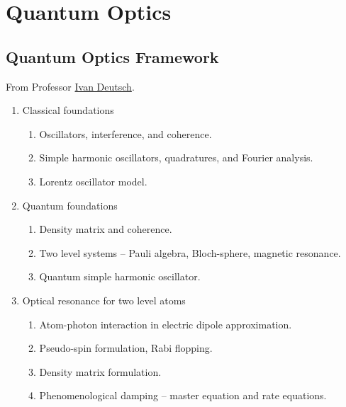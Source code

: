 \documentclass[letterpaper,10pt,english]{sphinxmanual}
\begin{document}
\section{Quantum Optics}
\label{Quantum/QuantumOptics:quantum-optics}\label{Quantum/QuantumOptics::doc}

\subsection{Quantum Optics Framework}
\label{Quantum/QuantumOptics:quantum-optics-framework}
From Professor \href{http://info.phys.unm.edu/~ideutsch/Classes/Phys566F13/index.htm\#syllabus}{Ivan Deutsch}.
\begin{enumerate}
\item {} 
Classical foundations
\begin{enumerate}
\item {} 
Oscillators, interference, and coherence.

\item {} 
Simple harmonic oscillators, quadratures, and Fourier analysis.

\item {} 
Lorentz oscillator model.

\end{enumerate}

\item {} 
Quantum foundations
\begin{enumerate}
\item {} 
Density matrix and coherence.

\item {} 
Two level systems -- Pauli algebra, Bloch-sphere, magnetic resonance.

\item {} 
Quantum simple harmonic oscillator.

\end{enumerate}

\item {} 
Optical resonance for two level atoms
\begin{enumerate}
\item {} 
Atom-photon interaction in electric dipole approximation.

\item {} 
Pseudo-spin formulation, Rabi flopping.

\item {} 
Density matrix formulation.

\item {} 
Phenomenological damping -- master equation and rate equations.


\end{enumerate}
\end{enumerate}
\end{document}
